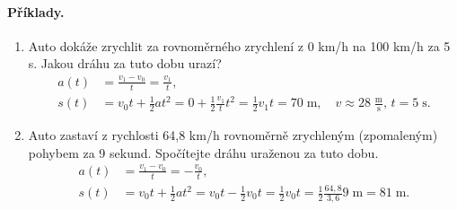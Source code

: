 \documentclass[11pt,a4paper]{article}
\begin{document}
            \paragraph*{Příklady.}
            \begin{enumerate}
                \item Auto dokáže zrychlit za rovnoměrného zrychlení z 0 km/h na 100 km/h za 5 s. Jakou dráhu za tuto dobu urazí?
                \begin{align*}
                    a(t) &= \frac{v_1 - v_0}{t} = \frac{v_1}{t},
                \\
                    s(t) &= v_0 t + \frac 12 a t^2 = 0 + \frac 12 \frac{v_1}{t} t^2 = \frac 12 v_1 t = 70 \; \mathrm m, \quad v \approx 28 \; \frac{\mathrm m}{\mathrm s}, \, t = 5 \; \mathrm s.
                \end{align*}
                
                \item Auto zastaví z rychlosti 64,8 km/h rovnoměrně zrychleným (zpomaleným) pohybem za 9 sekund. Spočítejte dráhu uraženou za tuto dobu.
                \begin{align*}
                    a(t) &= \frac{v_1 - v_0}{t} = - \frac{v_0}{t},
                \\
                    s(t) &= v_0t + \frac 12 a t^2 = v_0t - \frac 12 v_0 t = \frac 12 v_0 t = \frac 12 \frac{64,8}{3,6} 9 \; \mathrm m = 81 \; \mathrm m.
                \end{align*}


\end{enumerate}
\end{document}
